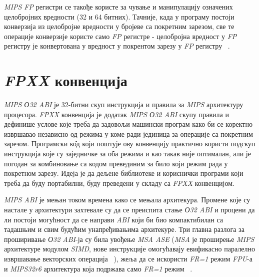 \documentclass[12pt,oneside]{memoir}
\begin{document}
\indent \textit{MIPS FP} регистри се такође користе за чување и манипулацију означених целобројних вредности (32 и 64 битних). Тачније, када у програму постоји конверзија из целобројне вредности у бројеве са покретним зарезом, све те операције конверзије користе само \textit{FP} регистре - целобројна вредност у  \textit{FP} регистру је конвертована у вредност у покрентом зарезу у  \textit{FP} регистру ~\cite{SeeMIPSRun}.

\section{\textit{FPXX} конвенција}
\label{sec_fpxx}

\indent \textit{MIPS О32 ABI} је 32-битни скуп инструкција и правила за \textit{MIPS} архитектуру процесора. \textit{FPXX} конвенција је додатак \textit{MIPS О32 ABI} скупу правила и дефинише услове које треба да задовољи машински програм како би се коректно извршавао независно од режима у коме ради јединица за операције са покретним зарезом. Програмски к\^{о}д који поштује ову конвенцију практично користи подскуп инструкција које су заједничке за оба режима и као такав није оптималан, али је погодан за комбиновање са кодом превединим за било који режим рада у покретном зарезу. Идеја је да дељене библиотеке и кориснички програми који треба да буду портабилни, буду преведени у складу са \textit{FPXX} конвенцијом.


\indent \textit{MIPS ABI} је мењан током времена како се мењала архитекура. Промене које су настале у архитектури захтевале су да се преиспита стање \textit{О32 ABI} и процени да ли постоји могућност да се направи \textit{ABI} који би био компактибилан са тадашњим и свим будућим унапређивањима архитекуре. Три главна разлога за проширивање \textit{О32 ABI}-ја су била увођење \textit{MSA ASE} (\textit{MSA} је проширење \textit{MIPS} архитектуре модулом \textit{SIMD}, нове инструкције омогућавају евификасно паралелно извршавање векторских операција ~\cite{MSA}), жеља да се искористи \textit{FR=1} режим \textit{FPU}-а и \textit{MIPS32r6} архитектура која подржава само \textit{FR=1} режим ~\cite{fpxxRef}.
\end{document}
